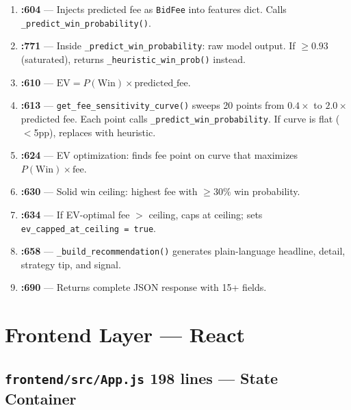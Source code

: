 \documentclass[11pt,a4paper]{article}
\newcommand{\file}[1]{\texttt{\color{gssblue!70!black}#1}}
\newcommand{\func}[1]{\texttt{\color{gssgreen!80!black}#1}}
\newcommand{\uitag}[1]{\colorbox{uipurple!15}{\small\textcolor{uipurple}{\textbf{#1}}}}
\begin{document}
\begin{enumerate}[leftmargin=2em]
    \item \textbf{:604} --- Injects predicted fee as \texttt{BidFee} into features dict. Calls \func{\_predict\_win\_probability()}.

    \item \textbf{:771} --- Inside \func{\_predict\_win\_probability}: raw model output. If $\geq 0.93$ (saturated), returns \func{\_heuristic\_win\_prob()} instead.

    \item \textbf{:610} --- $\text{EV} = P(\text{Win}) \times \text{predicted\_fee}$.

    \item \textbf{:613} --- \func{get\_fee\_sensitivity\_curve()} sweeps 20 points from $0.4\times$ to $2.0\times$ predicted fee. Each point calls \func{\_predict\_win\_probability}. If curve is flat ($<$5pp), replaces with heuristic.

    \item \textbf{:624} --- EV optimization: finds fee point on curve that maximizes $P(\text{Win}) \times \text{fee}$.

    \item \textbf{:630} --- Solid win ceiling: highest fee with $\geq 30\%$ win probability.

    \item \textbf{:634} --- If EV-optimal fee $>$ ceiling, caps at ceiling; sets \texttt{ev\_capped\_at\_ceiling = true}.

    \item \textbf{:658} --- \func{\_build\_recommendation()} generates plain-language headline, detail, strategy tip, and signal.

    \item \textbf{:690} --- Returns complete JSON response with 15+ fields.
\end{enumerate}

\section{Frontend Layer --- React}
\label{sec:frontend}

\subsection{\file{frontend/src/App.js} \uitag{198 lines} --- State Container}
\end{document}
